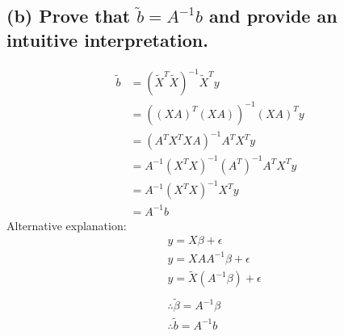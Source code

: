 \documentclass[12pt, a4paper]{article}
\begin{document}
\subsection*{(b) Prove that $\tilde{b} = A^{-1}b$ and provide an intuitive interpretation.}
\begin{align*}
    \tilde{b} &= (\tilde{X}^T\tilde{X})^{-1}\tilde{X}^Ty\\
    &=((XA)^T(XA))^{-1}(XA)^Ty\\
    &= (A^TX^TXA)^{-1}A^TX^Ty\\
    & = A^{-1}(X^TX)^{-1}(A^T)^{-1}A^TX^Ty\\
    & = A^{-1}(X^TX)^{-1}X^Ty\\
    &= A^{-1}b
\end{align*}
Alternative explanation:
\begin{align*}
    &y = X\beta + \epsilon\\
    &y = XAA^{-1}\beta + \epsilon\\
    &y = \tilde{X}(A^{-1}\beta) + \epsilon\\\\
    &\therefore \tilde{\beta} = A^{-1}\beta\\
    &\therefore \tilde{b} = A^{-1}b\\
\end{align*}
\vspace{1em}
\end{document}
